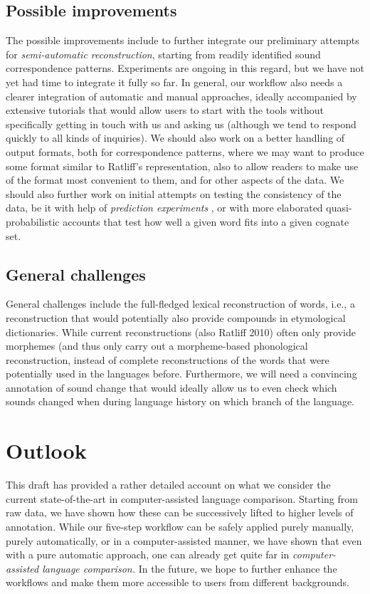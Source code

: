 \documentclass[xetex,svgnames]{scrartcl}
\begin{document}
\subsection{Possible improvements}
The possible improvements include to further integrate our preliminary attempts for
\emph{semi-automatic reconstruction}, starting from readily identified sound correspondence
patterns. Experiments are ongoing in this regard, but we have not yet had time to integrate it fully
so far. In general, our workflow also needs a clearer integration of automatic and manual
approaches, ideally accompanied by extensive tutorials that would allow users to start with the
tools without specifically getting in touch with us and asking us (although we tend to respond
quickly to all kinds of inquiries). We should also work on a better handling of output formats, both
for correspondence patterns, where we may want to produce some format similar to Ratliff's
representation, also to allow readers to make use of the format most convenient to them, and for
other aspects of the data. We should also further work on initial attempts on testing the
consistency of the data, be it with help of \emph{prediction experiments} \citep{Bodt2019PREPRINTa},
or with more elaborated quasi-probabilistic accounts that test how well a given word fits into a
given cognate set.

\subsection{General challenges}

General challenges include the full-fledged lexical reconstruction of words, i.e., a reconstruction
that would potentially also provide compounds in etymological dictionaries. While current
reconstructions (also Ratliff 2010) often only provide morphemes (and thus only carry out a
morpheme-based phonological reconstruction, instead of complete reconstructions of the words that
were potentially used in the languages before. Furthermore, we will need a convincing annotation of
sound change that would ideally allow us to even check which sounds changed when during language
history on which branch of the language.


\section{Outlook}

This draft has provided a rather detailed account on what we consider the current state-of-the-art
in computer-assisted language comparison. Starting from raw data, we have shown how these can be
successively lifted to higher levels of annotation. While our five-step workflow can be safely
applied purely manually, purely automatically, or in a computer-assisted manner, we have shown that
even with a pure automatic approach, one can already get quite far in \emph{computer-assisted
language comparison.} In the future, we hope to further enhance the workflows and make them more
accessible to users from different backgrounds.

\nocite{List2019a}

\printbibliography
\end{document}
